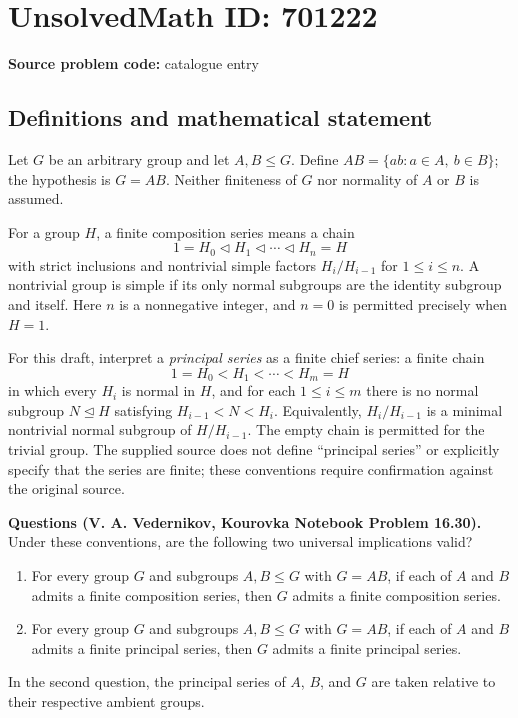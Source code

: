 \documentclass[11pt]{article}
\begin{document}
\section*{UnsolvedMath ID: 701222}
\textbf{Source problem code:} catalogue entry
\subsection{Definitions and mathematical statement}
Let \(G\) be an arbitrary group and let \(A,B\leq G\). Define \(AB=\{ab:a\in A,\ b\in B\}\); the hypothesis is \(G=AB\). Neither finiteness of \(G\) nor normality of \(A\) or \(B\) is assumed.

For a group \(H\), a finite composition series means a chain
\[
1=H_0\triangleleft H_1\triangleleft\cdots\triangleleft H_n=H
\]
with strict inclusions and nontrivial simple factors \(H_i/H_{i-1}\) for \(1\leq i\leq n\). A nontrivial group is simple if its only normal subgroups are the identity subgroup and itself. Here \(n\) is a nonnegative integer, and \(n=0\) is permitted precisely when \(H=1\).

For this draft, interpret a \emph{principal series} as a finite chief series: a finite chain
\[
1=H_0<H_1<\cdots<H_m=H
\]
in which every \(H_i\) is normal in \(H\), and for each \(1\leq i\leq m\) there is no normal subgroup \(N\trianglelefteq H\) satisfying \(H_{i-1}<N<H_i\). Equivalently, \(H_i/H_{i-1}\) is a minimal nontrivial normal subgroup of \(H/H_{i-1}\). The empty chain is permitted for the trivial group. The supplied source does not define ``principal series'' or explicitly specify that the series are finite; these conventions require confirmation against the original source.

\textbf{Questions (V. A. Vedernikov, Kourovka Notebook Problem 16.30).} Under these conventions, are the following two universal implications valid?
\begin{enumerate}
\item For every group \(G\) and subgroups \(A,B\leq G\) with \(G=AB\), if each of \(A\) and \(B\) admits a finite composition series, then \(G\) admits a finite composition series.
\item For every group \(G\) and subgroups \(A,B\leq G\) with \(G=AB\), if each of \(A\) and \(B\) admits a finite principal series, then \(G\) admits a finite principal series.
\end{enumerate}
In the second question, the principal series of \(A\), \(B\), and \(G\) are taken relative to their respective ambient groups.
\end{document}
